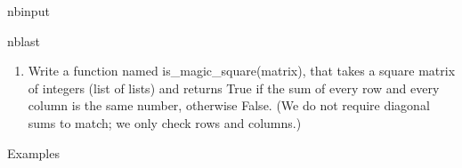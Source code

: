\documentclass[letterpaper,10pt,english]{sphinxmanual}
\begin{document}
\begin{sphinxuseclass}{nbinput}
\begin{sphinxuseclass}{nblast}
{
\begin{sphinxVerbatim}[commandchars=\\\{\}]
\llap{\color{nbsphinxin}[3]:\,\hspace{\fboxrule}\hspace{\fboxsep}}    
      \PYG{p}{[}\PYG{p}{]}  
       
        \PYG{p}{[}  \PYG{p}{]}  

       
         \PYG{p}{[}\PYG{p}{]}  \PYG{p}{[}  \PYG{p}{]}
             
     

\end{sphinxVerbatim}
}

\end{sphinxuseclass}
\end{sphinxuseclass}

\begin{enumerate}
%
\setcounter{enumi}{1}
\item {} 
\sphinxAtStartPar
{} Write a function named is\_magic\_square(matrix), that takes a square matrix of integers (list of lists) and returns True if the sum of every row and every column is the same number, otherwise False. (We do not require diagonal sums to match; we only check rows and columns.)

\end{enumerate}

\sphinxAtStartPar
Examples
\end{document}
